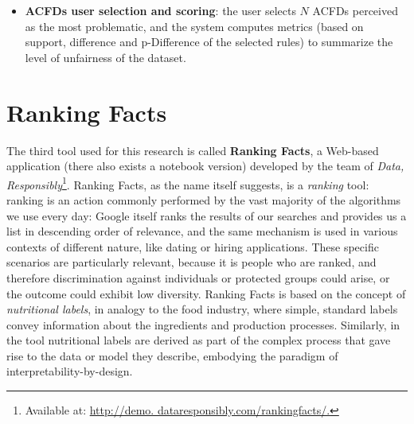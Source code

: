 \begin{itemize}
\item \textbf{ACFDs user selection and scoring}: the user selects \(N\) ACFDs perceived as the most problematic, and the system computes metrics (based on support, difference and p-Difference of the selected rules) to summarize the level of unfairness of the dataset.
\end{itemize}


\section{Ranking Facts}
\label{section:ranking_facts}
The third tool used for this research is called \textbf{Ranking Facts}, a Web-based application (there also exists a notebook version) developed by the team of \textit{Data, Responsibly}\footnote{Available at: \url{http://demo. dataresponsibly.com/rankingfacts/.}}. Ranking Facts, as the name itself suggests, is a \textit{ranking} tool: ranking is an action commonly performed by the vast majority of the algorithms we use every day: Google itself ranks the results of our searches and provides us a list in descending order of relevance, and the same mechanism is used in various contexts of different nature, like dating or hiring applications. These specific scenarios are particularly relevant, because it is people who are ranked, and therefore discrimination against individuals or protected groups could arise, or the outcome could exhibit low diversity. Ranking Facts is based on the concept of \textit{nutritional labels}, in analogy to the food industry, where simple, standard labels convey information about the ingredients and production processes. Similarly, in the tool nutritional labels are derived as part of the complex process that gave rise to the data or model they describe, embodying the paradigm of interpretability-by-design.

